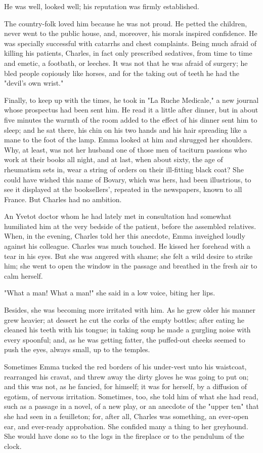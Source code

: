 \documentclass{tufte-book}
\begin{document}
He was well, looked well; his reputation was firmly established.

The country-folk loved him because he was not proud. He petted the
children, never went to the public house, and, moreover, his morals
inspired confidence. He was specially successful with catarrhs and chest
complaints. Being much afraid of killing his patients, Charles, in fact
only prescribed sedatives, from time to time and emetic, a footbath,
or leeches. It was not that he was afraid of surgery; he bled people
copiously like horses, and for the taking out of teeth he had the
"devil's own wrist."

Finally, to keep up with the times, he took in "La Ruche Medicale,"
a new journal whose prospectus had been sent him. He read it a little
after dinner, but in about five minutes the warmth of the room added to
the effect of his dinner sent him to sleep; and he sat there, his chin
on his two hands and his hair spreading like a mane to the foot of the
lamp. Emma looked at him and shrugged her shoulders. Why, at least, was
not her husband one of those men of taciturn passions who work at their
books all night, and at last, when about sixty, the age of rheumatism
sets in, wear a string of orders on their ill-fitting black coat?
She could have wished this name of Bovary, which was hers, had been
illustrious, to see it displayed at the booksellers', repeated in the
newspapers, known to all France. But Charles had no ambition.

An Yvetot doctor whom he had lately met in consultation had somewhat
humiliated him at the very bedside of the patient, before the assembled
relatives. When, in the evening, Charles told her this anecdote, Emma
inveighed loudly against his colleague. Charles was much touched. He
kissed her forehead with a tear in his eyes. But she was angered with
shame; she felt a wild desire to strike him; she went to open the window
in the passage and breathed in the fresh air to calm herself.

"What a man! What a man!" she said in a low voice, biting her lips.

Besides, she was becoming more irritated with him. As he grew older his
manner grew heavier; at dessert he cut the corks of the empty bottles;
after eating he cleaned his teeth with his tongue; in taking soup
he made a gurgling noise with every spoonful; and, as he was getting
fatter, the puffed-out cheeks seemed to push the eyes, always small, up
to the temples.

Sometimes Emma tucked the red borders of his under-vest unto his
waistcoat, rearranged his cravat, and threw away the dirty gloves he was
going to put on; and this was not, as he fancied, for himself; it
was for herself, by a diffusion of egotism, of nervous irritation.
Sometimes, too, she told him of what she had read, such as a passage in
a novel, of a new play, or an anecdote of the "upper ten" that she
had seen in a feuilleton; for, after all, Charles was something, an
ever-open ear, and ever-ready approbation. She confided many a thing to
her greyhound. She would have done so to the logs in the fireplace or to
the pendulum of the clock.
\end{document}
